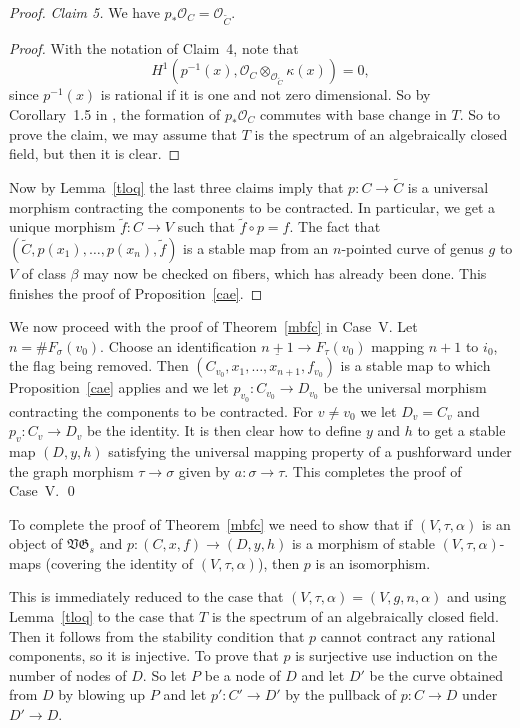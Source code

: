 \documentclass[11pt]{amsart}
\theoremstyle{definition}
\theoremstyle{remark}
\newenvironment{pf}{\begin{proof}}{\end{proof}}
\renewcommand{\tilde}{\widetilde}
\newcommand{\lst}{_{\ast}}
\newcommand{\GG}{{\mathfrak{G}}}
\newcommand{\VV}{{\mathfrak{V}}}
\renewcommand{\O}{{\mathcal{O}}}
\newcommand{\comp}{\mathbin{{\scriptstyle\circ}}}
\renewcommand{\ul}{\underline}
\renewcommand{\t}{_{\tau}}
\newcommand{\s}{_{\sigma}}
\theoremstyle{plain}
\theoremstyle{definition}
\theoremstyle{remark}
\begin{document}
\begin{pf}
{\em Claim 5. }We have \(p\lst\O_C=\O_{\tilde{C}}\).
\begin{pf}
With the notation of Claim~4, note that
\[
H^1(p^{-1}(x),\O_C\otimes_{\O_{\tilde{C}}}\kappa(x))=0,
\]
since \(p^{-1}(x)\) is rational if it is one and not zero dimensional. So by
Corollary~1.5 in \cite{knudsen}, the
formation of \(p\lst\O_C\) commutes with base change in \(T\). So to prove the
claim, we may assume that \(T\) is the
spectrum of an algebraically closed field, but then it is clear.
\end{pf}

Now by Lemma~\ref{tloq} the last three claims imply that
\(p:C\rightarrow\tilde{C}\) is a universal morphism contracting
the components to be contracted. In particular, we get a unique morphism
\(\tilde{f}:C\rightarrow V\) such that
\(\tilde{f}\comp p=f\). The fact that
\((\tilde{C},p(x_1),\ldots,p(x_n),\tilde{f})\) is a stable map from an
\(n\)-pointed
curve of genus \(g\) to \(V\) of class \(\beta\) may now be checked on fibers, which
has already been done.  This finishes the
proof of Proposition~\ref{cae}.
\end{pf}

We now proceed with the proof of Theorem~\ref{mbfc} in Case~V\@. Let \(n=\#
F\s(v_0)\). Choose an identification
\(\ul{n+1}\rightarrow F\t(v_0)\) mapping \(n+1\) to \(i_0\), the flag being removed.
Then
\((C_{v_0},x_1,\ldots,x_{n+1},f_{v_0})\) is a stable map to which
Proposition~\ref{cae} applies and we let
\(p_{v_0}:C_{v_0}\rightarrow D_{v_0}\) be the universal morphism contracting the
components to be contracted. For
\(v\not=v_0\) we let \(D_v=C_v\) and \(p_v:C_v\rightarrow D_v\) be the identity. It
is then clear how to define \(y\) and \(h\) to
get a stable map \((D,y,h)\) satisfying the universal mapping property of a
pushforward under the graph morphism
\(\tau\rightarrow \sigma\) given by \(a:\sigma\rightarrow \tau\). This completes
the proof of Case~V\@. \qed

To complete the proof of Theorem~\ref{mbfc} we need to show that if
\((V,\tau,\alpha)\) is an object of \(\VV\GG_s\) and
\(p:(C,x,f)\rightarrow(D,y,h)\) is a morphism of stable \((V,\tau,\alpha)\)-maps
(covering the identity of
\((V,\tau,\alpha)\)), then \(p\) is an isomorphism.

This is immediately reduced to the case that \((V,\tau,\alpha)=(V,g,n,\alpha)\)
and using Lemma~\ref{tloq} to the case that
\(T\) is the spectrum of an algebraically closed field. Then it follows from the
stability condition that \(p\) cannot
contract any rational components, so it is injective. To prove that \(p\) is
surjective use induction on the number of
nodes of \(D\). So let \(P\) be a node of \(D\) and let \(D'\) be the curve obtained
from \(D\) by blowing up \(P\) and let
\(p':C'\rightarrow D'\) by the pullback of \(p:C\rightarrow D\) under
\(D'\rightarrow D\).
\end{document}
